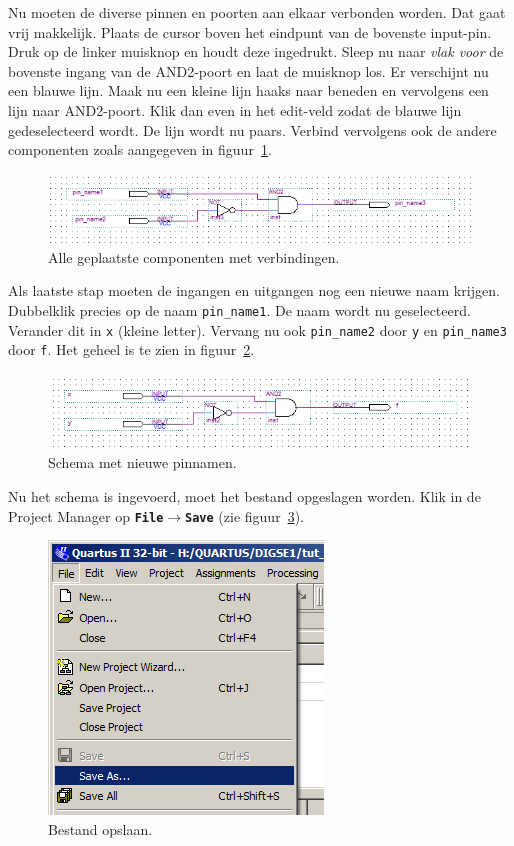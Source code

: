 \documentclass[a4paper,12pt,fleqn,twoside]{book}
\def\tutpicscale{0.455}
\newcommand{\menu}[1]{\texttt{\textbf{#1}}}
\newcommand{\naam}[1]{\texttt{#1}}
\def\pijl{$\rightarrow$}%
\begin{document}
Nu moeten de diverse pinnen en poorten aan elkaar verbonden worden. Dat gaat
vrij makkelijk. Plaats de cursor boven het eindpunt van de bovenste input-pin.
Druk op de linker muisknop en houdt deze ingedrukt. Sleep nu naar \textsl{vlak
voor} de bovenste ingang van de AND2-poort en laat de muisknop los. Er
verschijnt nu een blauwe lijn. Maak nu een kleine lijn haaks naar beneden en 
vervolgens een lijn naar AND2-poort. Klik dan even in het edit-veld zodat de
blauwe lijn gedeselecteerd wordt. De lijn wordt nu paars. Verbind vervolgens
ook de andere componenten zoals aangegeven in figuur~\ref{fig:027withwires}.

\begin{figure}[H]
\centering
\includegraphics[scale=\tutpicscale]{027withwires}
\caption{Alle geplaatste componenten met verbindingen.}
\label{fig:027withwires}
\end{figure}

Als laatste stap moeten de ingangen en uitgangen nog een nieuwe naam krijgen.
Dubbelklik precies op de naam \naam{pin\_name1}. De naam wordt nu
geselecteerd. Verander dit in \naam{x} (kleine letter). Vervang nu ook
\naam{pin\_name2} door \naam{y} en \naam{pin\_name3} door \naam{f}. Het geheel
is te zien in figuur~\ref{fig:028withpinnames}. 

\begin{figure}[H]
\centering
\includegraphics[scale=\tutpicscale]{028withpinnames}
\caption{Schema met nieuwe pinnamen.}
\label{fig:028withpinnames}
\end{figure}

Nu het schema is ingevoerd, moet het bestand opgeslagen worden. Klik in de
Project Manager op \menu{File\pijl{}Save} (zie figuur~\ref{fig:029savefile}).
 
\begin{figure}[H]
\centering
\includegraphics[scale=\tutpicscale]{029savefile}
\caption{Bestand opslaan.}
\label{fig:029savefile}
\end{figure}
\end{document}
